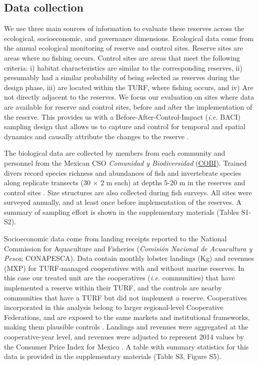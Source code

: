 \documentclass{frontiersSCNS}
\begin{document}
\hypertarget{data-collection}{%
\subsection{Data collection}\label{data-collection}}

We use three main sources of information to evaluate these reserves
across the ecological, socioeconomic, and governance dimensions.
Ecological data come from the annual ecological monitoring of reserve
and control sites. Reserve sites are areas where no fishing occurs.
Control sites are areas that meet the following criteria: i) habitat
characteristics are similar to the corresponding reserves, ii)
presumably had a similar probability of being selected as reserves
during the design phase, iii) are located within the TURF, where fishing
occurs, and iv) Are not directly adjacent to the reserves. We focus our
evaluation on sites where data are available for reserve and control
sites, before and after the implementation of the reserve. This provides
us with a Before-After-Control-Impact (\emph{i.e.} BACI) sampling design
that allows us to capture and control for temporal and spatial dynamics
\citep{stewartoaten_1986,depalma_2018} and causally attribute the
changes to the reserve
\citep{francinifilho_2008,Villasenor-Derbez_2018}.

The biological data are collected by members from each community and
personnel from the Mexican CSO \emph{Comunidad y Biodiversidad}
(\href{www.cobi.org.mx}{COBI}). Trained divers record species richness
and abundances of fish and invertebrate species along replicate
transects (30 \(\times\) 2 m each) at depths 5-20 m in the reserves and
control sites \citep{suman_2010-ez,fulton_2018,fulton_2019}. Size
structures are also collected during fish surveys. All sites were
surveyed annually, and at least once before implementation of the
reserves. A summary of sampling effort is shown in the supplementary
materials (Tables S1-S2).

Socioeconomic data come from landing receipts reported to the National
Commission for Aquaculture and Fisheries (\emph{Comisión Nacional de
Acuacultura y Pesca}; CONAPESCA). Data contain monthly lobster landings
(Kg) and revenues (MXP) for TURF-managed cooperatives with and without
marine reserves. In this case our treated unit are the cooperatives
(\emph{i.e.} communities) that have implemented a reserve within their
TURF, and the controls are nearby communities that have a TURF but did
not implement a reserve. Cooperatives incorporated in this analysis
belong to larger regional-level Cooperative Federations, and are exposed
to the same markets and institutional frameworks, making them plausible
controls \citep{mccay_2017,ayer_2018}. Landings and revenues were
aggregated at the cooperative-year level, and revenues were adjusted to
represent 2014 values by the Consumer Price Index for Mexico
\citep{oecd_2017}. A table with summary statistics for this data is
provided in the supplementary materials (Table S3, Figure S5).
\end{document}
